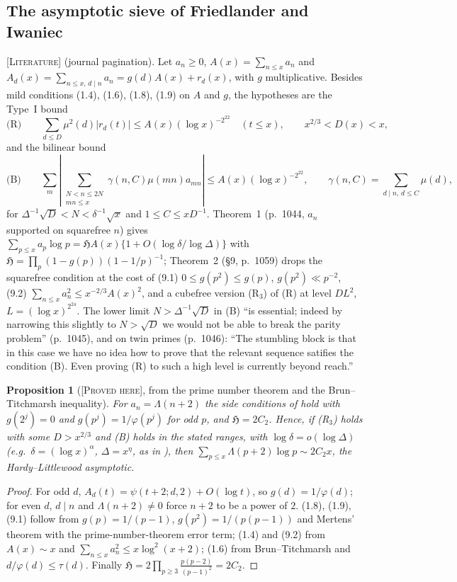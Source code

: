 \documentclass[11pt]{amsart}
\newtheorem{proposition}[theorem]{Proposition}
\theoremstyle{definition}
\theoremstyle{remark}
\newcommand{\lbl}[1]{\textup{\textsc{[#1]}}}
\begin{document}
\subsection{The asymptotic sieve of Friedlander and Iwaniec}
\lbl{Literature} \cite{FI98} (journal pagination). Let
$a_n\ge0$, $A(x)=\sum_{n\le x}a_n$ and
$A_d(x)=\sum_{n\le x,\,d\mid n}a_n=g(d)A(x)+r_d(x)$, with $g$ multiplicative. Besides mild conditions (1.4), (1.6), (1.8),
(1.9) on $A$ and $g$, the hypotheses are the Type~I bound
\[
\text{(R)}\qquad \sum_{d\le D}\mu^2(d)|r_d(t)|\le A(x)(\log x)^{-2^{22}}
\quad(t\le x),\qquad x^{2/3}<D(x)<x,
\]
and the bilinear bound
\[
\text{(B)}\qquad \sum_m\left|\sum_{\substack{N<n\le2N\\ mn\le x}}
\gamma(n,C)\mu(mn)a_{mn}\right|\le A(x)(\log x)^{-2^{22}},
\qquad \gamma(n,C)=\sum_{d\mid n,\,d\le C}\mu(d),
\]
for $\Delta^{-1}\sqrt D<N<\delta^{-1}\sqrt x$ and $1\le C\le xD^{-1}$.
Theorem~1 (p.~1044, $a_n$ supported on squarefree $n$) gives
$\sum_{p\le x}a_p\log p=\mathfrak HA(x)\{1+O(\log\delta/\log\Delta)\}$ with
$\mathfrak H=\prod_p(1-g(p))(1-1/p)^{-1}$; Theorem~2 (\S9, p.~1059) drops the
squarefree condition at the cost of (9.1) $0\le g(p^2)\le g(p)$,
$g(p^2)\ll p^{-2}$, (9.2) $\sum_{n\le x}a_n^2\le x^{-2/3}A(x)^2$, and a cubefree
version (R$_3$) of (R) at level $DL^2$, $L=(\log x)^{2^{24}}$. The lower limit
$N>\Delta^{-1}\sqrt D$ in (B) ``is essential; indeed by narrowing this
slightly to $N>\sqrt D$ we would not be able to break the parity problem''
(p.~1045), and on twin primes (p.~1046): ``The stumbling block is that in this
case we have no idea how to prove that the relevant sequence satifies the
condition (B). Even proving (R) to such a high level is currently beyond
reach.''

\begin{proposition}[\lbl{Proved here}, from the prime number theorem and the Brun--Titchmarsh inequality]
\label{prop:fi-twin}
For $a_n=\Lambda(n+2)$ the side conditions of \cite[Theorem~2]{FI98} hold with
$g(2^j)=0$ and $g(p^j)=1/\varphi(p^j)$ for odd $p$, and $\mathfrak H=2C_2$. Hence,
if \textup{(R$_3$)} holds with some $D>x^{2/3}$ and \textup{(B)} holds in the
stated ranges, with $\log\delta=o(\log\Delta)$ (e.g.\ $\delta=(\log x)^{\alpha}$,
$\Delta=x^{\eta}$, as in \cite[p.~1044]{FI98}), then
$\sum_{p\le x}\Lambda(p+2)\log p\sim2C_2x$, the Hardy--Littlewood asymptotic.
\end{proposition}

\begin{proof}
For odd $d$, $A_d(t)=\psi(t+2;d,2)+O(\log t)$, so $g(d)=1/\varphi(d)$; for even
$d$, $d\mid n$ and $\Lambda(n+2)\ne0$ force $n+2$ to be a power of $2$. (1.8),
(1.9), (9.1) follow from $g(p)=1/(p-1)$, $g(p^2)=1/(p(p-1))$ and Mertens'
theorem with the prime-number-theorem error term; (1.4) and (9.2) from
$A(x)\sim x$ and $\sum_{n\le x}a_n^2\le x\log^2(x+2)$; (1.6) from
Brun--Titchmarsh and $d/\varphi(d)\le\tau(d)$. Finally
$\mathfrak H=2\prod_{p\ge3}\frac{p(p-2)}{(p-1)^2}=2C_2$.
\end{proof}
\end{document}
